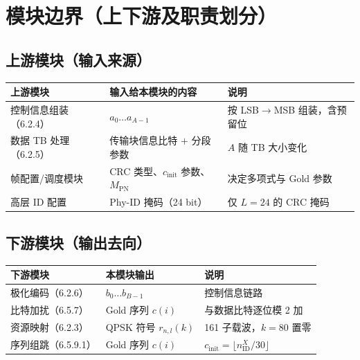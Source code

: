 \documentclass[11pt,a4paper]{ctexart}
\begin{document}
\section{模块边界（上下游及职责划分）}

\subsection{上游模块（输入来源）}

\begin{table}[h]
\centering
\small
\begin{tabular}{p{4.2cm}p{4.5cm}p{5.5cm}}
\toprule
\textbf{上游模块} & \textbf{输入给本模块的内容} & \textbf{说明} \\
\midrule
控制信息组装（6.2.4） & $a_0\ldots a_{A-1}$ & 按 LSB$\rightarrow$MSB 组装，含预留位 \\
数据 TB 处理（6.2.5） & 传输块信息比特 $+$ 分段参数 & $A$ 随 TB 大小变化 \\
帧配置/调度模块 & CRC 类型、$c_{\mathrm{init}}$ 参数、$M_{\mathrm{PN}}$ & 决定多项式与 Gold 参数 \\
高层 ID 配置 & Phy-ID 掩码（24 bit） & 仅 $L{=}24$ 的 CRC 掩码 \\
\bottomrule
\end{tabular}
\end{table}

\subsection{下游模块（输出去向）}

\begin{table}[h]
\centering
\small
\begin{tabular}{p{4.2cm}p{4.5cm}p{5.5cm}}
\toprule
\textbf{下游模块} & \textbf{本模块输出} & \textbf{说明} \\
\midrule
极化编码（6.2.6） & $b_0\ldots b_{B-1}$ & 控制信息链路 \\
比特加扰（6.5.7） & Gold 序列 $c(i)$ & 与数据比特逐位模 2 加 \\
资源映射（6.2.3） & QPSK 符号 $r_{n,l}(k)$ & 161 子载波，$k{=}80$ 置零 \\
序列组跳（6.5.9.1） & Gold 序列 $c(i)$ & $c_{\mathrm{init}}=\lfloor n_{\mathrm{ID}}^X/30\rfloor$ \\
\bottomrule
\end{tabular}
\end{table}
\end{document}
